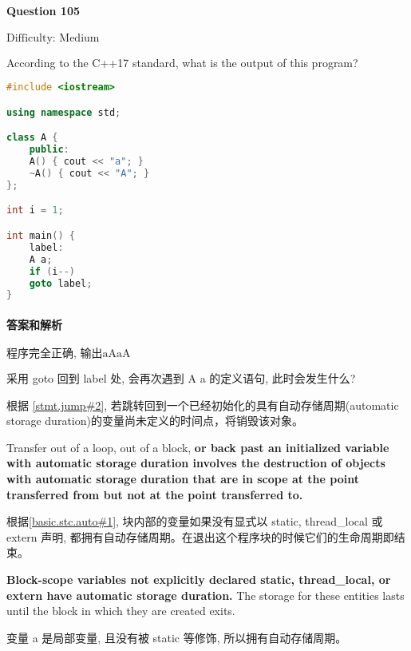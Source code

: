 \documentclass{article}
\begin{document}
	\paragraph*{Question 105} $\boxed{\text{Difficulty: Medium}} $	
	
	According to the C++17 standard, what is the output of this program?	
	
	\begin{lstlisting}[language=C++]
#include <iostream>

using namespace std;

class A {
	public:
	A() { cout << "a"; }
	~A() { cout << "A"; }
};

int i = 1;

int main() {
	label:
	A a;
	if (i--)
	goto label;
}
	\end{lstlisting}
	\paragraph*{答案和解析} $\boxed{\text{程序完全正确, 输出aAaA}} $
	
	采用 goto 回到 label 处, 会再次遇到 A a 的定义语句, 此时会发生什么?
	
	根据 \href{https://timsong-cpp.github.io/cppwp/n4659/stmt.jump#2}{[stmt.jump\#2]}, 若跳转回到一个已经初始化的具有自动存储周期(automatic storage duration)的变量尚未定义的时间点，将销毁该对象。

	\begin{lightgrayleftbar}
	Transfer out of a loop, out of a block, \textbf{or back past an initialized variable with automatic storage duration involves the destruction of objects with automatic storage duration that are in scope at the point transferred from but not at the point transferred to.} 
	\end{lightgrayleftbar}
	
		根据\href{https://timsong-cpp.github.io/cppwp/n4659/basic.stc.auto#1}{[basic.stc.auto\#1]}, 块内部的变量如果没有显式以 static, thread\_local 或 extern 声明, 都拥有自动存储周期。在退出这个程序块的时候它们的生命周期即结束。
	
	\begin{lightgrayleftbar}
		\textbf{Block-scope variables not explicitly declared static, thread\_­local, or extern have automatic storage duration.} The storage for these entities lasts until the block in which they are created exits.
	\end{lightgrayleftbar}
	
	变量 a 是局部变量, 且没有被 static 等修饰, 所以拥有自动存储周期。
	
\end{document}
